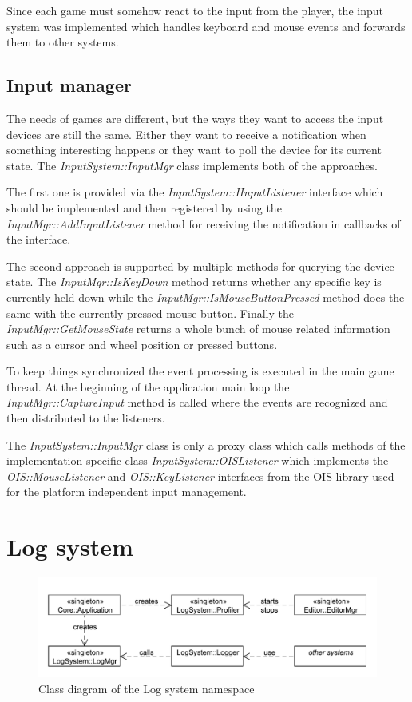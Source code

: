 \documentclass[a4paper, 12pt]{report}
\begin{document}
Since each game must somehow react to the input from the player, the input system was implemented which handles keyboard and mouse events and forwards them to other systems.

\section{Input manager}
The needs of games are different, but the ways they want to access the input devices are still the same. Either they want to receive a notification when something interesting happens or they want to poll the device for its current state. The \emph{InputSystem::InputMgr} class implements both of the approaches.

The first one is provided via the \emph{InputSystem::IInputListener} interface which should be implemented and then registered by using the \emph{InputMgr::\-AddInputListener} method for receiving the notification in callbacks of the interface.

The second approach is supported by multiple methods for querying the device state. The \emph{InputMgr::IsKeyDown} method returns whether any specific key is currently held down while the \emph{InputMgr::IsMouseButtonPressed} method does the same with the currently pressed mouse button. Finally the \emph{InputMgr::GetMouseState} returns a whole bunch of mouse related information such as a cursor and wheel position or pressed buttons.

To keep things synchronized the event processing is executed in the main game thread. At the beginning of the application main loop the \emph{InputMgr::CaptureInput} method is called where the events are recognized and then distributed to the listeners.

The \emph{InputSystem::InputMgr} class is only a proxy class which calls methods of the implementation specific class \emph{InputSystem::OISListener} which implements the \emph{OIS::MouseListener} and \emph{OIS::KeyListener} interfaces from the OIS library used for the platform independent input management.


\chapter{Log system}

\begin{figure}[htbp]
	\centering
		\includegraphics[width=1\textwidth]{LogSystemClassDiagram.pdf}
	\caption{Class diagram of the Log system namespace}
	\label{fig:logsystem-diagram}
\end{figure}
\end{document}
